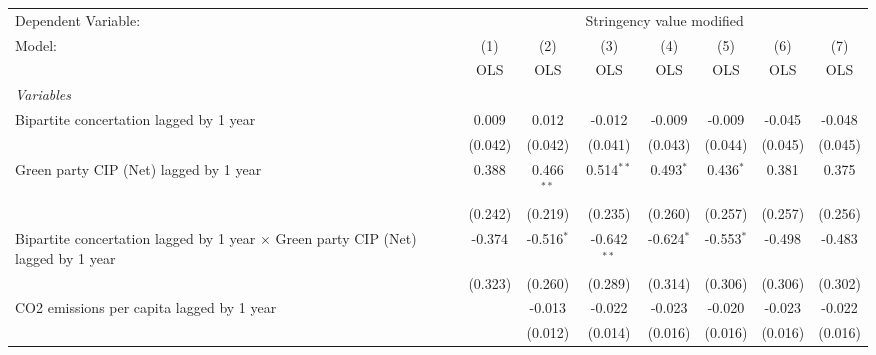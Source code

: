 
\begingroup
\centering
\begin{tabular}{lccccccc}
   \toprule
   Dependent Variable: & \multicolumn{7}{c}{Stringency value modified}\\
   Model:                                                                                   & (1)     & (2)          & (3)           & (4)          & (5)          & (6)            & (7)\\  
                                                                                            &  OLS    & OLS          & OLS           & OLS          & OLS          & OLS            & OLS\\  
   \midrule
   \emph{Variables}\\
   Bipartite concertation lagged by 1 year                                                  & 0.009   & 0.012        & -0.012        & -0.009       & -0.009       & -0.045         & -0.048\\   
                                                                                            & (0.042) & (0.042)      & (0.041)       & (0.043)      & (0.044)      & (0.045)        & (0.045)\\   
   Green party CIP (Net) lagged by 1 year                                                   & 0.388   & 0.466$^{**}$ & 0.514$^{**}$  & 0.493$^{*}$  & 0.436$^{*}$  & 0.381          & 0.375\\   
                                                                                            & (0.242) & (0.219)      & (0.235)       & (0.260)      & (0.257)      & (0.257)        & (0.256)\\   
   Bipartite concertation lagged by 1 year $\times$ Green party CIP (Net) lagged by 1 year  & -0.374  & -0.516$^{*}$ & -0.642$^{**}$ & -0.624$^{*}$ & -0.553$^{*}$ & -0.498         & -0.483\\   
                                                                                            & (0.323) & (0.260)      & (0.289)       & (0.314)      & (0.306)      & (0.306)        & (0.302)\\   
   CO2 emissions per capita lagged by 1 year                                                &         & -0.013       & -0.022        & -0.023       & -0.020       & -0.023         & -0.022\\   
                                                                                            &         & (0.012)      & (0.014)       & (0.016)      & (0.016)      & (0.016)        & (0.016)\\   

\end{tabular}
